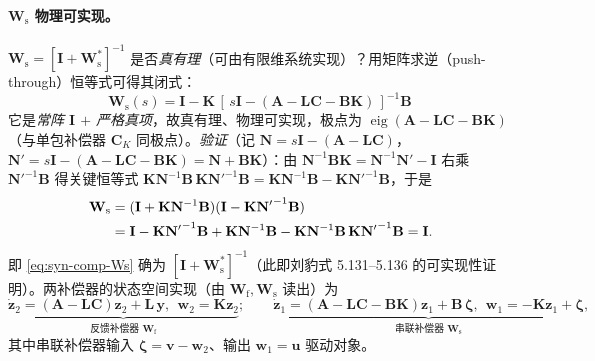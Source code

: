\paragraph{$\mathbf W_{\mathrm s}$ 物理可实现。}
$\mathbf W_{\mathrm s}=[\mathbf I+\mathbf W_{\mathrm s}^{*}]^{-1}$ 是否\emph{真有理}（可由有限维系统实现）？用矩阵求逆（push-through）恒等式可得其闭式：
\begin{equation}
  \boxed{\;\mathbf W_{\mathrm s}(s)=\mathbf I-\mathbf K\,[\,s\mathbf I-(\mathbf A-\mathbf L\mathbf C-\mathbf B\mathbf K)\,]^{-1}\mathbf B\;}
  \label{eq:syn-comp-Ws}
\end{equation}
它是\emph{常阵 $\mathbf I$ $+$ 严格真项}，故真有理、物理可实现，极点为 $\operatorname{eig}(\mathbf A-\mathbf L\mathbf C-\mathbf B\mathbf K)$（与单包补偿器 $\mathbf C_K$ 同极点）。\emph{验证}（记 $\mathbf N=s\mathbf I-(\mathbf A-\mathbf L\mathbf C)$，$\mathbf N'=s\mathbf I-(\mathbf A-\mathbf L\mathbf C-\mathbf B\mathbf K)=\mathbf N+\mathbf B\mathbf K$）：由 $\mathbf N^{-1}\mathbf B\mathbf K=\mathbf N^{-1}\mathbf N'-\mathbf I$ 右乘 ${\mathbf N'}^{-1}\mathbf B$ 得关键恒等式 $\mathbf K\mathbf N^{-1}\mathbf B\,\mathbf K{\mathbf N'}^{-1}\mathbf B=\mathbf K\mathbf N^{-1}\mathbf B-\mathbf K{\mathbf N'}^{-1}\mathbf B$，于是
\begin{align}
  [\mathbf I+\mathbf W_{\mathrm s}^{*}]\,\mathbf W_{\mathrm s}
  &=(\mathbf I+\mathbf K\mathbf N^{-1}\mathbf B)(\mathbf I-\mathbf K{\mathbf N'}^{-1}\mathbf B)\notag\\
  &=\mathbf I-\mathbf K{\mathbf N'}^{-1}\mathbf B+\mathbf K\mathbf N^{-1}\mathbf B-\mathbf K\mathbf N^{-1}\mathbf B\,\mathbf K{\mathbf N'}^{-1}\mathbf B=\mathbf I.
  \label{eq:syn-comp-verify}
\end{align}
即 \cref{eq:syn-comp-Ws} 确为 $[\mathbf I+\mathbf W_{\mathrm s}^{*}]^{-1}$（此即刘豹式 5.131--5.136 的可实现性证明）。两补偿器的状态空间实现（由 $\mathbf W_{\mathrm f},\mathbf W_{\mathrm s}$ 读出）为
\begin{equation}
  \underbrace{\dot{\mathbf z}_2=(\mathbf A-\mathbf L\mathbf C)\mathbf z_2+\mathbf L\,\mathbf y,\ \ \mathbf w_2=\mathbf K\mathbf z_2}_{\text{反馈补偿器 }\mathbf W_{\mathrm f}};\qquad
  \underbrace{\dot{\mathbf z}_1=(\mathbf A-\mathbf L\mathbf C-\mathbf B\mathbf K)\mathbf z_1+\mathbf B\,\boldsymbol\zeta,\ \ \mathbf w_1=-\mathbf K\mathbf z_1+\boldsymbol\zeta}_{\text{串联补偿器 }\mathbf W_{\mathrm s}},
  \label{eq:syn-comp-realize}
\end{equation}
其中串联补偿器输入 $\boldsymbol\zeta=\mathbf v-\mathbf w_2$、输出 $\mathbf w_1=\mathbf u$ 驱动对象。

